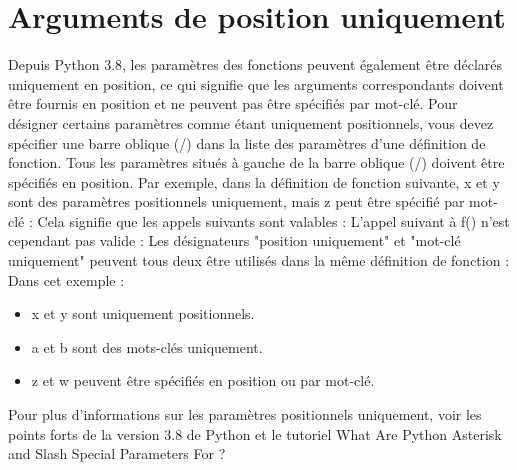 \section{Arguments de position uniquement}
Depuis Python 3.8, les paramètres des fonctions peuvent également être déclarés uniquement en position, ce qui signifie que les arguments correspondants doivent être fournis en position et ne peuvent pas être spécifiés par mot-clé.
Pour désigner certains paramètres comme étant uniquement positionnels, vous devez spécifier une barre oblique (/) dans la liste des paramètres d'une définition de fonction.  Tous les paramètres situés à gauche de la barre oblique (/) doivent être spécifiés en position. Par exemple, dans la définition de fonction suivante, x et y sont des paramètres positionnels uniquement, mais z peut être spécifié par mot-clé :
Cela signifie que les appels suivants sont valables :
L'appel suivant à f() n'est cependant pas valide :
Les désignateurs "position uniquement" et "mot-clé uniquement" peuvent tous deux être utilisés dans la même définition de fonction :
Dans cet exemple :
\begin{itemize}
\item x et y sont uniquement positionnels.
\item a et b sont des mots-clés uniquement.
\item z et w peuvent être spécifiés en position ou par mot-clé.
\end{itemize}
Pour plus d'informations sur les paramètres positionnels uniquement, voir les points forts de la version 3.8 de Python et le tutoriel What Are Python Asterisk and Slash Special Parameters For ?
